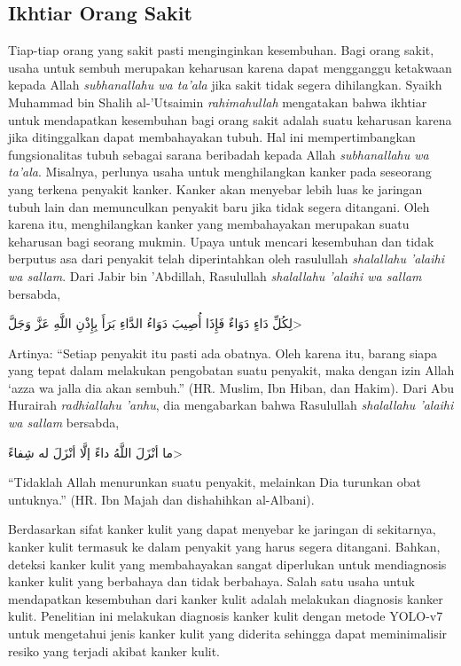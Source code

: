     \subsection{Ikhtiar Orang Sakit}
    Tiap-tiap orang yang sakit pasti menginginkan kesembuhan. Bagi orang sakit, usaha untuk sembuh merupakan keharusan karena dapat mengganggu ketakwaan kepada Allah \textit{subhanallahu wa ta'ala} jika sakit tidak segera dihilangkan. Syaikh Muhammad bin Shalih al-'Utsaimin \textit{rahimahullah} mengatakan bahwa ikhtiar untuk mendapatkan kesembuhan bagi orang sakit adalah suatu keharusan karena jika ditinggalkan dapat membahayakan tubuh. Hal ini mempertimbangkan fungsionalitas tubuh sebagai sarana beribadah kepada Allah \textit{subhanallahu wa ta'ala}. Misalnya, perlunya usaha untuk menghilangkan kanker pada seseorang yang terkena penyakit kanker. Kanker akan menyebar lebih luas ke jaringan tubuh lain dan memunculkan penyakit baru jika tidak segera ditangani. Oleh karena itu, menghilangkan kanker yang membahayakan merupakan suatu keharusan bagi seorang mukmin. Upaya untuk mencari kesembuhan dan tidak berputus asa dari penyakit telah diperintahkan oleh rasulullah \textit{shalallahu 'alaihi wa sallam}. Dari Jabir bin 'Abdillah, Rasulullah \textit{shalallahu 'alaihi wa sallam} bersabda,

    \begin{flushright}
        \<لِكُلِّ دَاءٍ دَوَاءٌ فَإِذَا أُصِيبَ دَوَاءُ الدَّاءِ بَرَأَ بِإِذْنِ اللَّهِ عَزَّ وَجَلَّ>
    \end{flushright}

    Artinya: “Setiap penyakit itu pasti ada obatnya. Oleh karena itu, barang siapa yang tepat dalam melakukan pengobatan suatu penyakit, maka dengan izin Allah ‘azza wa  jalla dia akan sembuh.” (HR. Muslim, Ibn Hiban, dan Hakim). Dari Abu Hurairah \textit{radhiallahu 'anhu}, dia mengabarkan bahwa Rasulullah \textit{shalallahu 'alaihi wa sallam} bersabda,

    \begin{flushright}
        \<ما أنْزَلَ اللَّهُ داءً إلَّا أنْزَلَ له شِفاءً>
    \end{flushright}

    “Tidaklah Allah menurunkan suatu penyakit, melainkan Dia turunkan obat untuknya.” (HR. Ibn Majah dan dishahihkan al-Albani).

    Berdasarkan sifat kanker kulit yang dapat menyebar ke jaringan di sekitarnya, kanker kulit termasuk ke dalam penyakit yang harus segera ditangani. Bahkan, deteksi kanker kulit yang membahayakan sangat diperlukan untuk mendiagnosis kanker kulit yang berbahaya dan tidak berbahaya. Salah satu usaha untuk mendapatkan kesembuhan dari kanker kulit adalah melakukan diagnosis kanker kulit. Penelitian ini melakukan diagnosis kanker kulit dengan metode YOLO-v7 untuk mengetahui jenis kanker kulit yang diderita sehingga dapat meminimalisir resiko yang terjadi akibat kanker kulit.








